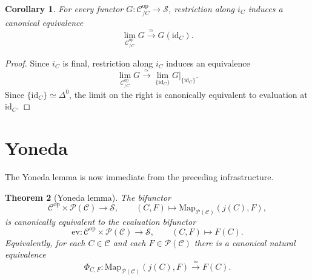 \documentclass[11pt]{article}
\newtheorem{theorem}{Theorem}[section]
\newtheorem{corollary}[theorem]{Corollary}
\theoremstyle{definition}
\newcommand{\C}{\mathcal{C}}
\newcommand{\Sps}{\mathcal{S}}
\newcommand{\PSh}{\mathcal{P}(\mathcal{C})}
\newcommand{\Map}{\mathrm{Map}}
\newcommand{\id}{\mathrm{id}}
\newcommand{\op}{\mathrm{op}}
\newcommand{\ev}{\mathrm{ev}}
\begin{document}
\begin{corollary}\label{cor:restrict-terminal}
For every functor $G \colon \C^{\op}_{/C} \to \Sps$, restriction along $i_C$
induces a canonical equivalence
\[
  \lim_{\C^{\op}_{/C}} G \xrightarrow{\simeq} G(\id_C).
\]
\end{corollary}

\begin{proof}
Since $i_C$ is final, restriction along $i_C$ induces an equivalence
\[
  \lim_{\C^{\op}_{/C}} G \xrightarrow{\simeq} \lim_{\{\id_C\}} G|_{\{\id_C\}}.
\]
Since $\{\id_C\} \simeq \Delta^0$, the limit on the right is canonically
equivalent to evaluation at $\id_C$.
\end{proof}

\section{Yoneda}

The Yoneda lemma is now immediate from the preceding infrastructure.

\begin{theorem}[Yoneda lemma]\label{thm:yoneda}
The bifunctor
\[
  \C^{\op} \times \PSh \to \Sps,
  \qquad
  (C,F) \longmapsto \Map_{\PSh}(j(C),F),
\]
is canonically equivalent to the evaluation bifunctor
\[
  \ev \colon \C^{\op} \times \PSh \to \Sps,
  \qquad
  (C,F) \longmapsto F(C).
\]
Equivalently, for each $C \in \C$ and each $F \in \PSh$ there is a canonical
natural equivalence
\[
  \Phi_{C,F} \colon \Map_{\PSh}(j(C),F) \xrightarrow{\simeq} F(C).
\]
\end{theorem}
\end{document}
